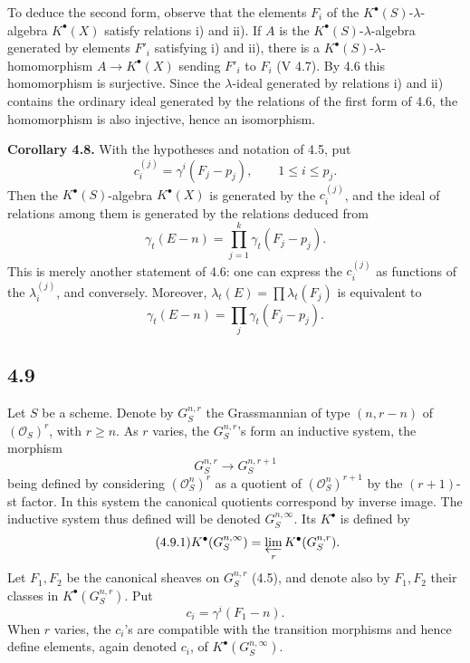 \documentclass[11pt]{article}
\begin{document}
To deduce the second form, observe that the elements \(F_i\) of the \(K^\bullet(S)\)-\(\lambda\)-algebra \(K^\bullet(X)\) satisfy relations i) and ii). If \(A\) is the \(K^\bullet(S)\)-\(\lambda\)-algebra generated by elements \(F'_i\) satisfying i) and ii), there is a \(K^\bullet(S)\)-\(\lambda\)-homomorphism \(A\to K^\bullet(X)\) sending \(F'_i\) to \(F_i\) (V 4.7). By 4.6 this homomorphism is surjective. Since the \(\lambda\)-ideal generated by relations i) and ii) contains the ordinary ideal generated by the relations of the first form of 4.6, the homomorphism is also injective, hence an isomorphism.

\textbf{Corollary 4.8.} With the hypotheses and notation of 4.5, put
\[
  c_i^{(j)}=\gamma^i(F_j-p_j),
  \qquad 1\leq i\leq p_j .
\]
Then the \(K^\bullet(S)\)-algebra \(K^\bullet(X)\) is generated by the \(c_i^{(j)}\), and the ideal of relations among them is generated by the relations deduced from
\[
  \gamma_t(E-n)=\prod_{j=1}^{k}\gamma_t(F_j-p_j).
\]
This is merely another statement of 4.6: one can express the \(c_i^{(j)}\) as functions of the \(\lambda_i^{(j)}\), and conversely. Moreover, \(\lambda_t(E)=\prod\lambda_t(F_j)\) is equivalent to
\[
  \gamma_t(E-n)=\prod_j \gamma_t(F_j-p_j).
\]

\subsection*{4.9}
Let \(S\) be a scheme. Denote by \(G_S^{n,r}\) the Grassmannian of type \((n,r-n)\) of \((\mathcal O_S)^r\), with \(r\geq n\). As \(r\) varies, the \(G_S^{n,r}\)'s form an inductive system, the morphism
\[
  G_S^{n,r}\longrightarrow G_S^{n,r+1}
\]
being defined by considering \((\mathcal O_S^n)^r\) as a quotient of \((\mathcal O_S^n)^{r+1}\) by the \((r+1)\)-st factor. In this system the canonical quotients correspond by inverse image. The inductive system thus defined will be denoted \(G_S^{n,\infty}\). Its \(K^\bullet\) is defined by
\begin{equation}\tag{4.9.1}
  K^\bullet(G_S^{n,\infty})=\varprojlim_r K^\bullet(G_S^{n,r}).
\end{equation}
Let \(F_1,F_2\) be the canonical sheaves on \(G_S^{n,r}\) (4.5), and denote also by \(F_1,F_2\) their classes in \(K^\bullet(G_S^{n,r})\). Put
\[
  c_i=\gamma^i(F_1-n).
\]
When \(r\) varies, the \(c_i\)'s are compatible with the transition morphisms and hence define elements, again denoted \(c_i\), of \(K^\bullet(G_S^{n,\infty})\).
\end{document}
